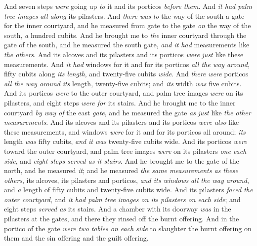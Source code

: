 \begin{biblechapter}
\verse And seven steps \textit{were} going up \textit{to} it and its porticos \textit{before them}. And \textit{it had palm tree images} \textit{all along} its pilasters.
\verse And \textit{there was} \textit{to} the way of the south a gate for the inner courtyard, and he measured from gate to the gate \textit{on} the way of the south, \textit{a} hundred cubits.
 And he brought me to \textit{the} inner courtyard through the gate of the south, and he measured the south gate, \textit{and it had} measurements like \textit{the others}.
\verse And its alcoves and its pilasters and its porticos \textit{were} \textit{just} like these measurements. And \textit{it had} windows for it and for its porticos \textit{all the way around}, fifty cubits along \textit{its length}, and twenty-five cubits \textit{wide}.
\verse And \textit{there were} porticos \textit{all the way around} \textit{its} length, twenty-five cubits; and \textit{its} width \textit{was} five cubits.
\verse And its porticos \textit{were} to the outer courtyard, and palm tree images \textit{were} on its pilasters, and eight steps \textit{were for} its stairs.
\verse And he brought me to the inner courtyard \textit{by way of} the east \textit{gate}, and he measured the gate \textit{as} \textit{just} like \textit{the other measurements}.
\verse And its alcoves and its pilasters and its porticos \textit{were also} like these measurements, and windows \textit{were} for it and for its porticos all around; \textit{its} length \textit{was} fifty cubits, \textit{and} \textit{it was} twenty-five cubits wide.
\verse And its porticos \textit{were} toward the outer courtyard, and palm tree images \textit{were} on its pilasters \textit{one each side}, and \textit{eight steps served as it stairs}.
\verse And he brought me to the gate of the north, and he measured \textit{it}; and he measured \textit{the same measurements as these others},
\verse its alcoves, its pilasters and porticos, \textit{and its windows} \textit{all the way around}, and \textit{a} length of fifty cubits and twenty-five cubits wide.
\verse And its pilasters \textit{faced the outer courtyard}, and \textit{it had palm tree images on its pilasters} \textit{on each side}; and eight steps \textit{served as} its stairs.
 And a chamber with its doorway \textit{was} in the pilasters at the gates, and there they rinsed off the burnt offering.
\verse And in the portico of the gate \textit{were two tables on each side} to slaughter the burnt offering on them and the sin offering and the guilt offering.

\end{biblechapter}
